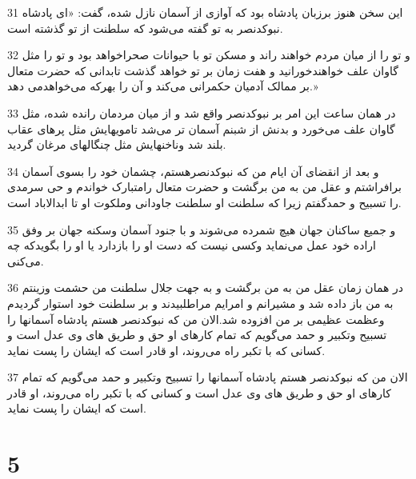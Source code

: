 \par 31 این سخن هنوز برزبان پادشاه بود که آوازی از آسمان نازل شده، گفت: «ای پادشاه نبوکدنصر به تو گفته می‌شود که سلطنت از تو گذشته است.
\par 32 و تو را از میان مردم خواهند راند و مسکن تو با حیوانات صحراخواهد بود و تو را مثل گاوان علف خواهندخورانید و هفت زمان بر تو خواهد گذشت تابدانی که حضرت متعال بر ممالک آدمیان حکمرانی می‌کند و آن را بهر‌که می‌خواهدمی دهد.»
\par 33 در همان ساعت این امر بر نبوکدنصر واقع شد و از میان مردمان رانده شده، مثل گاوان علف می‌خورد و بدنش از شبنم آسمان تر می‌شد تامویهایش مثل پرهای عقاب بلند شد وناخنهایش مثل چنگالهای مرغان گردید.
\par 34 و بعد از انقضای آن ایام من که نبوکدنصرهستم، چشمان خود را بسوی آسمان برافراشتم و عقل من به من برگشت و حضرت متعال رامتبارک خواندم و حی سرمدی را تسبیح و حمدگفتم زیرا که سلطنت او سلطنت جاودانی وملکوت او تا ابدالاباد است.
\par 35 و جمیع ساکنان جهان هیچ شمرده می‌شوند و با جنود آسمان وسکنه جهان بر وفق اراده خود عمل می‌نماید وکسی نیست که دست او را باز‌دارد یا او را بگویدکه چه می‌کنی.
\par 36 در همان زمان عقل من به من برگشت و به جهت جلال سلطنت من حشمت وزینتم به من باز داده شد و مشیرانم و امرایم مراطلبیدند و بر سلطنت خود استوار گردیدم وعظمت عظیمی بر من افزوده شد.الان من که نبوکدنصر هستم پادشاه آسمانها را تسبیح وتکبیر و حمد می‌گویم که تمام کارهای او حق و طریق های وی عدل است و کسانی که با تکبر راه می‌روند، او قادر است که ایشان را پست نماید.
\par 37 الان من که نبوکدنصر هستم پادشاه آسمانها را تسبیح وتکبیر و حمد می‌گویم که تمام کارهای او حق و طریق های وی عدل است و کسانی که با تکبر راه می‌روند، او قادر است که ایشان را پست نماید.

\chapter{5}

